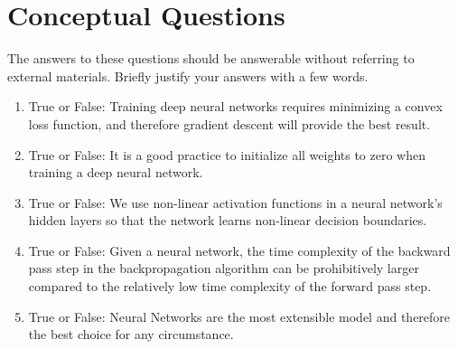 \documentclass{article}
\begin{document}


\section*{Conceptual Questions}
\begin{aprob}
    The answers to these questions should be answerable without referring to external materials. Briefly justify your answers with a few words.
    \begin{enumerate}
        \item {} True or False:   Training deep neural networks requires minimizing a convex loss function, and therefore gradient descent will provide the best result.
        \item {} True or False: It is a good practice to initialize all weights to zero when training a deep neural network.
        \item {} True or False:   We use non-linear activation functions in a neural network’s hidden layers so that the network learns non-linear decision boundaries.
        \item {} True or False: Given a neural network, the time complexity of the backward pass step in the backpropagation algorithm can be prohibitively larger compared to the relatively low time complexity of the forward pass step.
        \item {} True or False: Neural Networks are the most extensible model and therefore the best choice for any circumstance.
    \end{enumerate}

\end{aprob}
\end{document}
